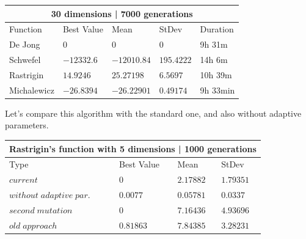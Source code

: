 \documentclass[12pt,leqno]{article}
\begin{document}
\begin{center}
  \begin{tabular}{|p{2.3cm}||p{3cm}|p{2cm}|p{2cm}|p{4.3cm}|} 
    \hline
    \multicolumn{5}{|c|}{30 dimensions | 7000 generations} \\
    \hline
    Function    & Best Value & Mean & StDev & Duration \\ 
    \hline\hline
    De Jong     & $ 0 $ & $ 0 $ & $ 0 $ & 9h 31m \\ 
    \hline
    Schwefel    & $ -12332.6 $ & $ -12010.84 $ & $ 195.4222 $ & 14h 6m \\ 
    \hline
    Rastrigin   & $ 14.9246 $ & $ 25.27198 $ & $ 6.5697 $ & 10h 39m \\ 
    \hline
    Michalewicz & $ -26.8394 $ & $ -26.22901 $ & $ 0.49174 $ & 9h 33min \\ 
    \hline
 \end{tabular}
\end{center}


\begin{center}
\end{center}

 Let's compare this algorithm with the standard one, and also without adaptive parameters.

\begin{center}
  \begin{tabular}{|p{5cm}||p{3cm}|p{2cm}|p{2cm}|} 
    \hline
    \multicolumn{4}{|c|}{Rastrigin's function with 5 dimensions | 1000 generations} \\
    \hline
    Type    & Best Value & Mean & StDev \\ 
    \hline\hline
    $ current $ & $ 0 $ & $ 2.17882 $ & $ 1.79351 $ \\ 
    \hline
    $ without \; adaptive \; par. \; $ & $ 0.0077 $ & $ 0.05781 $ & $ 0.0337 $ \\ 
    \hline
    $ second \; mutation \; $ & $ 0 $ & $ 7.16436 $ & $ 4.93696 $ \\ 
    \hline
    $ old \; approach $ & $ 0.81863 $ & $ 7.84385 $ & $ 3.28231 $ \\ 
    \hline
 \end{tabular}
\end{center}
 
\end{document}
